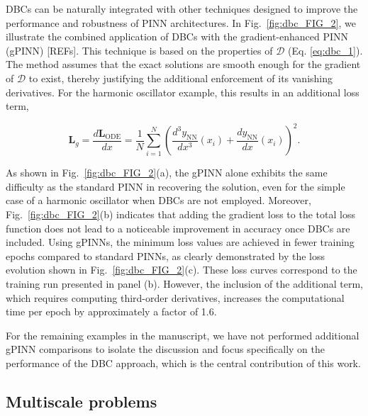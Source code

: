 DBCs can be naturally integrated with other techniques designed to improve the performance and robustness of PINN architectures. In Fig.~\ref{fig:dbc_FIG_2}, we illustrate the combined application of DBCs with the gradient-enhanced PINN (gPINN) [REFs]. This technique is based on the properties of $\mathcal{D}$ (Eq. \ref{eq:dbc_1}). The method assumes that the exact solutions are smooth enough for the gradient of $\mathcal{D}$ to exist, thereby justifying the additional enforcement of its vanishing derivatives. For the harmonic oscillator example, this results in an additional loss term,

\begin{equation}\label{eq:dbc_11}
\mathbf{L}_g=\frac{d\mathbf{L}_{\mathrm{ODE}}}{dx}=\frac{1}{N}\sum_{i=1}^N\left(\frac{d^3y_{\mathrm{NN}}}{dx^3}(x_i)+\frac{dy_{\mathrm{NN}}}{dx}(x_i)\right)^2.
\end{equation}

As shown in Fig.~\ref{fig:dbc_FIG_2}(a), the gPINN alone exhibits the same difficulty as the standard PINN in recovering the solution, even for the simple case of a harmonic oscillator when DBCs are not employed. Moreover, Fig.~\ref{fig:dbc_FIG_2}(b) indicates that adding the gradient loss to the total loss function does not lead to a noticeable improvement in accuracy once DBCs are included. Using gPINNs, the minimum loss values are achieved in fewer training epochs compared to standard PINNs, as clearly demonstrated by the loss evolution shown in Fig.~\ref{fig:dbc_FIG_2}(c). These loss curves correspond to the training run presented in panel (b). However, the inclusion of the additional term, which requires computing third-order derivatives, increases the computational time per epoch by approximately a factor of 1.6.

For the remaining examples in the manuscript, we have not performed additional gPINN comparisons to isolate the discussion and focus specifically on the performance of the DBC approach, which is the central contribution of this work.


\subsection{Multiscale problems}\label{sec:dbc_multiscale}

